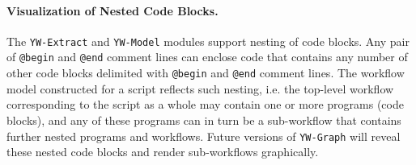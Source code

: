 \documentclass{article}
\newcommand{\YW}{\textsf{YesWorkflow}}
\newcommand{\yw}{\textsf{YW}}
\newcommand{\ywa}[1]{\texttt{#1}}
\newcommand{\ywm}[1]{\texttt{#1}}
\begin{document}


\paragraph{Visualization of Nested Code Blocks.}
The \ywm{YW-Extract} and \ywm{YW-Model} modules support
 nesting of code blocks. Any pair of \ywa{@begin} and \ywa{@end}
comment lines can enclose code that contains any number of other code
blocks delimited with \ywa{@begin} and \ywa{@end} comment lines.
The workflow model constructed for a script reflects such nesting, i.e.
the top-level workflow corresponding to the script as a whole may contain 
one or more programs (code blocks), and any of these programs can in turn be a 
sub-workflow that contains further nested programs and workflows.
%
Future versions of \ywm{YW-Graph} will reveal these nested code blocks 
and render sub-workflows graphically.
\end{document}
